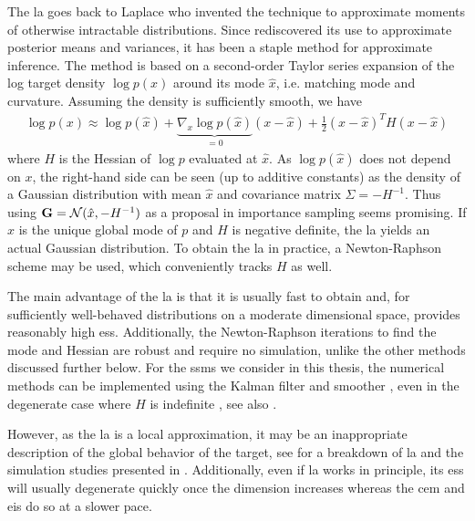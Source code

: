 The \acrfull{la} goes back to Laplace \cite{Laplace1986Memoir} who invented the technique to approximate moments of otherwise intractable distributions. Since \cite{Tierney1986Accurate,Tierney1989Fully} rediscovered its use to approximate posterior means and variances, it has been a staple method for approximate inference.
The method is based on a second-order Taylor series expansion of the log target density $\log p(x)$ around its mode $\hat x$, i.e. matching mode and curvature. Assuming the density is sufficiently smooth, we have
\begin{align}
    \label{eq:LA_approximation}
\log p(x) \approx \log p(\hat x) + \underbrace{\nabla_{x} \log p (\hat x)}_{= 0} \left( x - \hat x \right) + \frac{1}{2} (x - \hat x)^{T} H (x - \hat x)
\end{align}
where $H$ is the Hessian of $\log p$ evaluated at $\hat x$. As $\log p (\hat x)$ does not depend on $x$, the right-hand side can be seen (up to additive constants) as the density of a Gaussian distribution with mean $\hat x$ and covariance matrix $\Sigma = - H^{-1}$. Thus using $\mathbf G = \mathcal N (\hat x, -H^{-1})$ as a proposal in importance sampling seems promising. 
If $\hat x$ is the unique global mode of $p$ and $H$ is negative definite, the \gls{la} yields an actual Gaussian distribution. 
To obtain the \acrshort{la} in practice, a Newton-Raphson scheme may be used, which conveniently tracks $H$ as well. 

The main advantage of the \gls{la} is that it is usually fast to obtain and, for sufficiently well-behaved distributions on a moderate dimensional space, provides reasonably high \gls{ess}. Additionally, the Newton-Raphson iterations to find the mode and Hessian are robust and require no simulation, unlike the other methods discussed further below.
For the \glspl{ssm} we consider in this thesis, the numerical methods can be implemented using the Kalman filter and smoother \cite{Shephard1997Likelihood,Durbin1997Monte}, even in the degenerate case where $H$ is indefinite \cite{Jungbacker2007Monte}, see also .

However, as the \gls{la} is a local approximation, it may be an inappropriate description of the global behavior of the target, see  for a breakdown of \gls{la} and the simulation studies presented in . 
Additionally, even if \gls{la} works in principle, its \gls{ess} will usually degenerate quickly once the dimension increases whereas the \gls{cem} and \gls{eis} do so at a slower pace.

